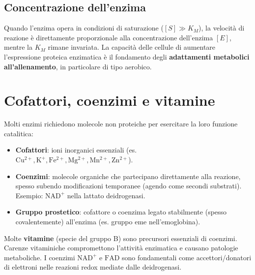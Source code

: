 \documentclass[12pt,a4paper]{report}
\begin{document}
\subsection{Concentrazione dell'enzima}
Quando l'enzima opera in condizioni di saturazione (\([S] \gg K_M\)), la velocità di reazione è direttamente proporzionale alla concentrazione dell'enzima \([E]\), mentre la \(K_M\) rimane invariata. La capacità delle cellule di aumentare l'espressione proteica enzimatica è il fondamento degli \textbf{adattamenti metabolici all'allenamento}, in particolare di tipo aerobico.

\section{Cofattori, coenzimi e vitamine}
Molti enzimi richiedono molecole non proteiche per esercitare la loro funzione catalitica:
\begin{itemize}
\item \textbf{Cofattori}: ioni inorganici essenziali (es. \(\mathrm{Cu^{2+}}, \mathrm{K^+}, \mathrm{Fe^{2+}}, \mathrm{Mg^{2+}}, \mathrm{Mn^{2+}}, \mathrm{Zn^{2+}}\)).
\item \textbf{Coenzimi}: molecole organiche che partecipano direttamente alla reazione, spesso subendo modificazioni temporanee (agendo come secondi substrati). Esempio: \(\mathrm{NAD^+}\) nella lattato deidrogenasi.
\item \textbf{Gruppo prostetico}: cofattore o coenzima legato stabilmente (spesso covalentemente) all'enzima (es. gruppo eme nell'emoglobina).
\end{itemize}
Molte \textbf{vitamine} (specie del gruppo B) sono precursori essenziali di coenzimi. Carenze vitaminiche compromettono l'attività enzimatica e causano patologie metaboliche. I coenzimi \(\mathrm{NAD^+}\) e \(\mathrm{FAD}\) sono fondamentali come accettori/donatori di elettroni nelle reazioni redox mediate dalle deidrogenasi.
\end{document}
